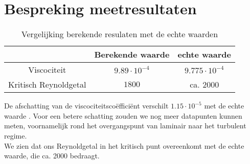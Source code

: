 \section{Bespreking meetresultaten}

\begin{table}[H]
    \centering
    \label{tab:vergelijking}
    \caption{Vergelijking berekende resulaten met de echte waarden}
    \begin{tabular}{| c | c | c |}
        \hline
                                & Berekende waarde      & echte waarde          \\ \hline
        Viscociteit             & $9.89 \cdot 10^{-4}$  & $9.775 \cdot 10^{-4}$ \\ \hline
        Kritisch Reynoldgetal   & $1800$                & ca. $2000$            \\ \hline
    \end{tabular}
\end{table}

De afschatting van de viscociteitsco\"effici\"ent verschilt $1.15 \cdot 10^{-5}$ met de echte waarde \cite{viscocity}.
Voor een betere schatting zouden we nog meer datapunten kunnen meten, voornamelijk rond het overgangspunt van laminair
naar het turbulent regime.
\\

We zien dat ons Reynoldgetal in het kritisch punt overeenkomt met de echte waarde, die ca. 2000 bedraagt.
